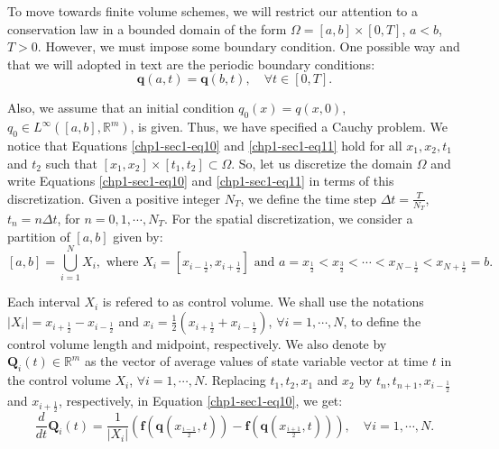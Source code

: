 To move towards finite volume schemes, we will restrict our attention
to a conservation law in a bounded domain of the form 
$\Omega = [a,b]\times[0,T]$, $a<b$, $T>0$. However, we must 
impose some boundary condition. One possible way and that we will adopted 
in text are the periodic boundary conditions:
\begin{equation}
        \label{chp1-sec1-eq12}
	\mathbf{q}(a, t) = \mathbf{q}(b, t),\quad \forall t \in [0, T].
\end{equation}

Also, we assume that an initial condition $q_0(x) = q(x,0)$, $q_0 \in L^{\infty}([a,b],\mathbb{R}^m)$, is given.
Thus, we have specified a Cauchy problem.
We notice that Equations \eqref{chp1-sec1-eq10} and \eqref{chp1-sec1-eq11}
hold for all $x_1, x_2, t_1$ and $t_2$ such that
$[x_1, x_2] \times [t_1, t_2] \subset \Omega$.
So, let us discretize the domain $\Omega$ and write 
Equations \eqref{chp1-sec1-eq10} and \eqref{chp1-sec1-eq11} in terms of this discretization.
Given a positive integer $N_T$, 
we define the time step $\Delta t = \frac{T}{N_T}$, $t_n = n \Delta t$, for $n = 0, 1 ,\cdots, N_T$.
For the spatial discretization, we consider a partition of $[a, b]$ given by: 
\begin{equation}
	\label{chp1-sec1-eq13}
	[a,b] = \bigcup_{i=1}^N X_i, 
	\text{ where } X_i= [x_{i-\frac{1}{2}}, x_{i+\frac{1}{2}}] \text{ and } 
	a = x_{\frac{1}{2}} < x_{\frac{3}{2}} < \cdots < x_{N-\frac{1}{2}} < x_{N+\frac{1}{2}} = b.
\end{equation}

Each interval $X_i$ is refered to as control volume. 
We shall use the notations $|X_i| = x_{i+\frac{1}{2}} - x_{i-\frac{1}{2}}$ 
and $x_i = \frac{1}{2}(x_{i+\frac{1}{2}} + x_{i-\frac{1}{2}})$, $\forall i = 1, \cdots, N$, 
to define the control volume length and midpoint, respectively.
We also denote by $\mathbf{Q}_i(t) \in \mathbb{R}^m$ as the vector of 
average values of state variable vector at time $t$
in the control volume $X_i$, $\forall i = 1, \cdots, N$. Replacing $t_1, t_2, x_1$ and 
$x_2$ by $t_{n}, t_{n+1}, x_{i-\frac{1}{2}}$ and $x_{i+\frac{1}{2}}$,
respectively, in Equation \ref{chp1-sec1-eq10}, we get:
\begin{equation}
        \label{chp1-sec1-eq14}
	\frac{d}{dt} \mathbf{Q}_i(t) = \frac{1}{|X_i|}
	(\mathbf{f}(\mathbf{q}(x_{\frac{i-1}{2}},t)) -
	\mathbf{f}(\mathbf{q}(x_{\frac{i+1}{2}},t))) ,
	\quad \forall i = 1, \cdots, N.
\end{equation}

